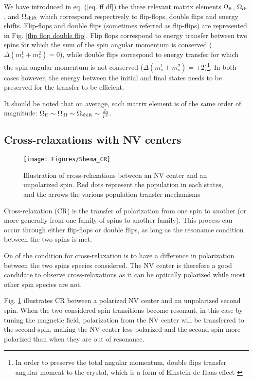 \documentclass[a4paper,11pt]{report}
\begin{document}
We have introduced in eq. (\ref{eq. ff df}) the three relevant matrix elements $\Omega_{\rm ff}$, $\Omega_{\rm df}$, and $\Omega_{\rm shift}$ which correspond respectively to flip-flops, double flips and energy shifts. Flip-flops and double flips (sometimes referred as flip-flips) are represented in Fig. \ref{flip flop double flip}. Flip flops correspond to energy transfer between two spins for which the sum of the spin angular momentum is conserved ($\Delta (m_s^1+m_s^2)=0$), while double flips correspond to energy transfer for which the spin angular momentum is not conserved ($\Delta (m_s^1+m_s^2)=\pm 2$)\footnote{In order to preserve the total angular momentum, double flips transfer angular moment to the crystal, which is a form of Einstein de Haas effect \citep{einstein1915experimental} }. In both cases however, the energy between the initial and final states needs to be preserved for the transfer to be efficient. 

It should be noted that on average, each matrix element is of the same order of magnitude: $\Omega_{\rm ff} \sim \Omega_{\rm df} \sim \Omega_{\rm shift} \sim \frac{J_0}{r^3}$. 

\subsection{Cross-relaxations with NV centers}

\begin{figure}[h]
\centering
\texttt{[image: Figures/Shema\_CR]}
\caption{Illustration of cross-relaxations between an NV center and an unpolarized spin. Red dots represent the population in each states, and the arrows the various population transfer mechanisms}
\label{CR_shema}
\end{figure}

Cross-relaxation (CR) is the transfer of polarization from one spin to another (or more generally from one family of spins to another family). This process can occur through either flip-flops or double flips, as long as the resonance condition between the two spins is met. 

On of the condition for cross-relaxation is to have a difference in polarization between the two spins species considered. The NV center is therefore a good candidate to observe cross-relaxations as it can be optically polarized while most other spin species are not. 

Fig. \ref{CR_shema} illustrates CR between a polarized NV center and an unpolarized second spin. When the two considered spin transitions become resonant, in this case by tuning the magnetic field, polarization from the NV center will be transferred to the second spin, making the NV center less polarized and the second spin more polarized than when they are out of resonance. 
\end{document}

